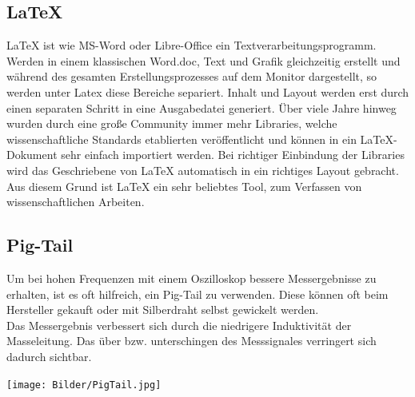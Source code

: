 \documentclass[a4paper,11pt]{scrartcl}
\begin{document}
\subsection{LaTeX}
LaTeX ist wie MS-Word oder Libre-Office ein Textverarbeitungsprogramm. Werden in einem klassischen Word.doc, Text und Grafik gleichzeitig erstellt und während des gesamten Erstellungsprozesses auf dem Monitor dargestellt, so werden unter Latex diese Bereiche separiert. Inhalt und Layout werden erst durch einen separaten Schritt in eine Ausgabedatei generiert. Über viele Jahre hinweg wurden durch eine große Community immer mehr Libraries, welche wissenschaftliche Standards etablierten veröffentlicht und können in ein LaTeX-Dokument sehr einfach importiert werden. Bei richtiger Einbindung der Libraries wird das Geschriebene von LaTeX automatisch in ein richtiges Layout gebracht. Aus diesem Grund ist LaTeX ein sehr beliebtes Tool, zum Verfassen von wissenschaftlichen Arbeiten.

\newpage
\subsection{Pig-Tail}
Um bei hohen Frequenzen mit einem Oszilloskop bessere Messergebnisse zu erhalten, ist es oft hilfreich, ein Pig-Tail zu verwenden. Diese können oft beim Hersteller gekauft oder mit Silberdraht selbst gewickelt werden. 
\\
Das Messergebnis verbessert sich durch die niedrigere Induktivität der Masseleitung. Das über bzw. unterschingen des Messsignales verringert sich dadurch sichtbar. 


\begin{center}

\texttt{[image: Bilder/PigTail.jpg]}


\end{center}
\end{document}
